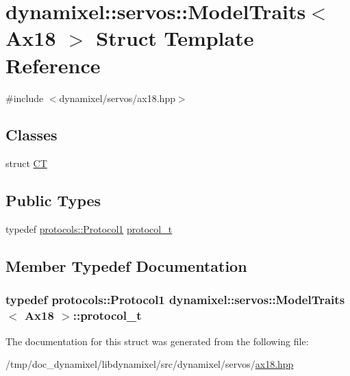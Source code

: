 \hypertarget{structdynamixel_1_1servos_1_1_model_traits_3_01_ax18_01_4}{}\section{dynamixel\+:\+:servos\+:\+:Model\+Traits$<$ Ax18 $>$ Struct Template Reference}
\label{structdynamixel_1_1servos_1_1_model_traits_3_01_ax18_01_4}


{\ttfamily \#include $<$dynamixel/servos/ax18.\+hpp$>$}

\subsection*{Classes}
\begin{DoxyCompactItemize}
\item 
struct \hyperlink{structdynamixel_1_1servos_1_1_model_traits_3_01_ax18_01_4_1_1_c_t}{CT}
\end{DoxyCompactItemize}
\subsection*{Public Types}
\begin{DoxyCompactItemize}
\item 
typedef \hyperlink{classdynamixel_1_1protocols_1_1_protocol1}{protocols\+::\+Protocol1} \hyperlink{structdynamixel_1_1servos_1_1_model_traits_3_01_ax18_01_4_a8ec1fab68931cfb87a497e39f2b2458a}{protocol\+\_\+t}
\end{DoxyCompactItemize}


\subsection{Member Typedef Documentation}
\subsubsection[{\texorpdfstring{protocol\+\_\+t}{protocol_t}}]{\setlength{\rightskip}{0pt plus 5cm}typedef {\bf protocols\+::\+Protocol1} {\bf dynamixel\+::servos\+::\+Model\+Traits}$<$ {\bf Ax18} $>$\+::{\bf protocol\+\_\+t}}\hypertarget{structdynamixel_1_1servos_1_1_model_traits_3_01_ax18_01_4_a8ec1fab68931cfb87a497e39f2b2458a}{}\label{structdynamixel_1_1servos_1_1_model_traits_3_01_ax18_01_4_a8ec1fab68931cfb87a497e39f2b2458a}


The documentation for this struct was generated from the following file\+:\begin{DoxyCompactItemize}
\item 
/tmp/doc\+\_\+dynamixel/libdynamixel/src/dynamixel/servos/\hyperlink{ax18_8hpp}{ax18.\+hpp}\end{DoxyCompactItemize}
